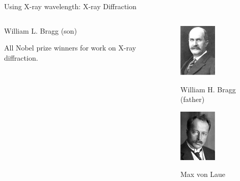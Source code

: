 \begin{slide}{Using X-ray wavelength: X-ray Diffraction}
\begin{columns}[T]
\begin{column}{47mm}
\begin{columns}[T]
\begin{column}{20mm}
           William L. Bragg (son)
           
           \vmm
           \vmm
           
           All Nobel prize winners for work on X-ray diffraction.
           
         \end{column}
         
         \begin{column}{20mm}         
           \includegraphics[width=18mm]{figs/images/WHBragg}
           
           William H. Bragg (father)
           
           \vmm
           \vmm
           
           \includegraphics[width=18mm]{figs/images/MaxvonLaue}
           
           Max von Laue        
          
          \end{column}
       \end{columns}


     \end{column}
   \end{columns}

 \vfill
\end{slide}     


